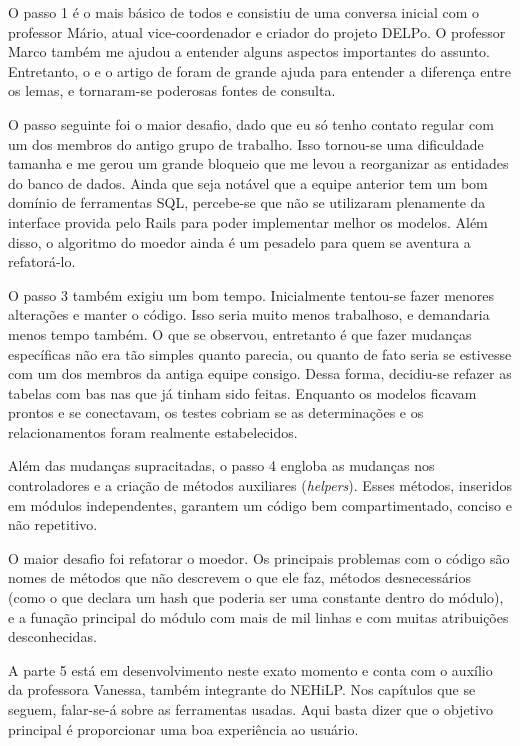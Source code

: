 O passo 1 é o mais básico de todos e consistiu de uma conversa inicial com o professor Mário, atual vice-coordenador
e criador do projeto DELPo. O professor Marco também me ajudou a entender alguns aspectos importantes do assunto.
Entretanto, o  e o artigo de \cite{Mar:17} foram de grande ajuda para entender a diferença entre os
lemas, e tornaram-se poderosas fontes de consulta.

O passo seguinte foi o maior desafio, dado que eu só tenho contato regular com um dos membros
do antigo grupo de trabalho. Isso tornou-se uma dificuldade tamanha e me gerou um grande bloqueio
que me levou a reorganizar as entidades do banco de dados. Ainda que seja notável que a equipe
anterior tem um bom domínio de ferramentas SQL, percebe-se que não se utilizaram plenamente da
interface provida pelo Rails para poder implementar melhor os modelos. Além disso, o algoritmo
do moedor ainda é um pesadelo para quem se aventura a refatorá-lo.

O passo 3 também exigiu um bom tempo. Inicialmente tentou-se fazer menores alterações e manter
o código. Isso seria muito menos trabalhoso, e demandaria menos tempo também. O que se observou,
entretanto é que fazer mudanças específicas não era tão simples quanto parecia, ou quanto de fato
seria se estivesse com um dos membros da antiga equipe consigo. Dessa forma, decidiu-se refazer as
tabelas com bas nas que já tinham sido feitas. Enquanto os modelos ficavam prontos e se conectavam,
os testes cobriam se as determinações e os relacionamentos foram realmente estabelecidos.

Além das mudanças supracitadas, o passo 4 engloba as mudanças nos controladores e a criação de métodos
auxiliares (\emph{helpers}). Esses métodos, inseridos em módulos independentes, garantem um código bem
compartimentado, conciso e não repetitivo.

O maior desafio foi refatorar o moedor. Os principais problemas com o código são nomes de métodos que
não descrevem o que ele faz, métodos desnecessários (como o que declara um hash que poderia ser uma
constante dentro do módulo), e a funação principal do módulo com mais de mil linhas e com muitas
atribuições desconhecidas.

A parte 5 está em desenvolvimento neste exato momento e conta com o auxílio da professora Vanessa,
também integrante do NEHiLP. Nos capítulos que se seguem, falar-se-á sobre as ferramentas usadas.
Aqui basta dizer que o objetivo principal é proporcionar uma boa experiência ao usuário.

